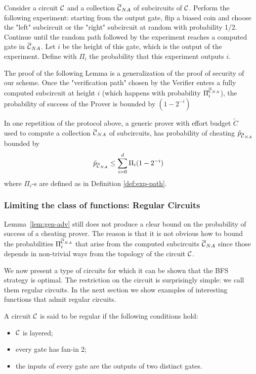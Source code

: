 \begin{definition}
	\label{def:exp-path}
	Consider a circuit $\cal C$ and a collection $\overline{\cal{C}}_{NA}$ of subcircuits of $\cal C$. Perform the following experiment: starting from the output gate, flip a biased coin and choose the "left" subcircuit or the "right" subcircuit at random with probability 1/2. Continue until the random path followed by the experiment reaches a computed gate in $\overline{\cal{C}}_{NA}$. Let $i$ be the height of this gate, which is the output of the experiment. Define with $\Pi_i$ the probability that this experiment outputs $i$.
\end{definition}

The proof of the following Lemma is a generalization of the proof of security of our scheme. Once the "verification path" chosen by the Verifier enters a fully computed subcircuit at height $i$ (which happens with probability $\Pi_i^{\overline{\cal{C}}_{NA}}$), the probability of success of the Prover is bounded by $(1 - 2^{-i})$

\begin{lemma}
\label{lem:gen-adv}
	In one repetition of the protocol above, a generic prover with effort budget $\tilde{C}$ used to compute a collection $\overline{\cal{C}}_{NA}$ of subcircuits, has probability of cheating $\tilde{p}_{\overline{\cal{C}}_{NA}}$ bounded by
	$$ \tilde{p}_{\overline{\cal{C}}_{NA}} \leq \sum_{i=0}^{d} \Pi_i (1 - 2^{-i})$$
	where $\Pi_i$-s are defined as in Definition \ref{def:exp-path}.
\end{lemma}

\subsubsection{Limiting the class of functions: Regular Circuits}


\smallskip
\noindent
Lemma~\ref{lem:gen-adv} still does not produce a clear bound on the probability of success of a cheating prover. The reason is that it is not obvious
how to bound the probabilities $\Pi_i^{\overline{\cal{C}}_{NA}}$ that arise from the computed subcircuits $\overline{\cal{C}}_{NA}$ since those depends in non-trivial ways from the 
topology of the circuit $\cal C$. 

We now present a type of circuits for which it can be shown that the BFS strategy is optimal. The restriction on the circuit is surprisingly simple: we call them 
{\sf regular circuits}. In 
the next section we show examples of interesting functions that admit regular circuits. 

\begin{definition}
\label{def:reg-circ}
	A circuit $\cal C$ is said to be regular if the following conditions hold:
	\begin{itemize}
		\item $\cal C$ is layered;
		\item every gate has fan-in 2;
		\item the inputs of every gate are the outputs of two distinct gates.
	\end{itemize}
\end{definition}

